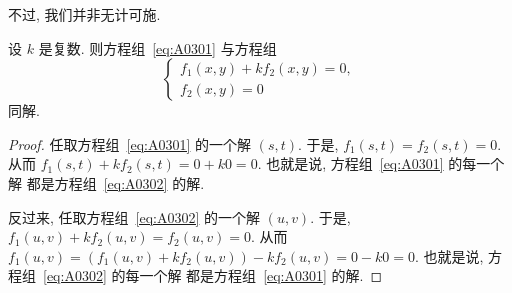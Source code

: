 不过, 我们并非无计可施.

\begin{theorem}
    设 \(k\) 是复数.
    则方程组~\eqref{eq:A0301}
    与方程组
    \begin{equation}
        \begin{cases}
            f_1 (x, y) + kf_2 (x, y) = 0, \\
            f_2 (x, y) = 0
        \end{cases}
        \label{eq:A0302}
    \end{equation}
    同解.
\end{theorem}

\begin{proof}
    任取方程组~\eqref{eq:A0301} 的一个解 \((s, t)\).
    于是, \(f_1 (s, t) = f_2 (s, t) = 0\).
    从而 \(f_1 (s, t) + kf_2 (s, t) = 0 + k0 = 0\).
    也就是说,
    方程组~\eqref{eq:A0301} 的每一个解%
    都是方程组~\eqref{eq:A0302} 的解.

    反过来, 任取方程组~\eqref{eq:A0302} 的一个解 \((u, v)\).
    于是,
    \(f_1 (u, v) + k f_2 (u, v) = f_2 (u, v) = 0\).
    从而 \(f_1 (u, v)
    = (f_1 (u, v) + k f_2 (u, v)) - kf_2 (u, v)
    = 0 - k0 = 0\).
    也就是说,
    方程组~\eqref{eq:A0302} 的每一个解%
    都是方程组~\eqref{eq:A0301} 的解.
\end{proof}

